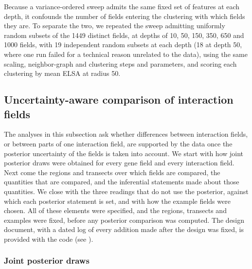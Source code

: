 \documentclass[10pt,letterpaper]{article}
\begin{document}
Because a variance-ordered sweep admits the same fixed set of features at each depth, it confounds the number of fields entering the clustering with which fields they are. To separate the two, we repeated the sweep admitting uniformly random subsets of the 1449 distinct fields, at depths of 10, 50, 150, 350, 650 and 1000 fields, with 19 independent random subsets at each depth (18 at depth 50, where one run failed for a technical reason unrelated to the data), using the same scaling, neighbor-graph and clustering steps and parameters, and scoring each clustering by mean ELSA at radius 50.

\subsection*{Uncertainty-aware comparison of interaction fields}
\label{sec:meth-uq}

The analyses in this subsection ask whether differences between interaction fields, or between parts of one interaction field, are supported by the data once the posterior uncertainty of the fields is taken into account. We start with how joint posterior draws were obtained for every gene field and every interaction field. Next come the regions and transects over which fields are compared, the quantities that are compared, and the inferential statements made about those quantities. We close with the three readings that do not use the posterior, against which each posterior statement is set, and with how the example fields were chosen. All of these elements were specified, and the regions, transects and examples were fixed, before any posterior comparison was computed. The design document, with a dated log of every addition made after the design was fixed, is provided with the code (see ).

\subsubsection*{Joint posterior draws}
\label{sec:meth-draws}
\end{document}
